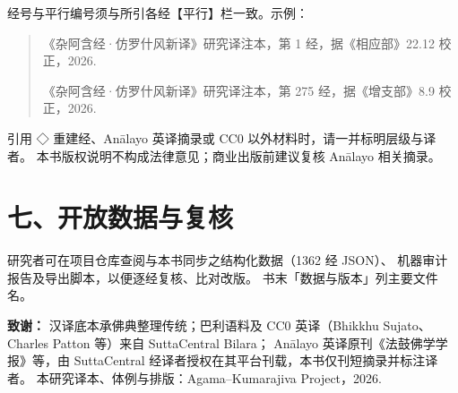 \noindent 经号与平行编号须与所引各经【平行】栏一致。示例：

\begin{quote}\small
《杂阿含经·仿罗什风新译》研究译注本，第 1 经，据《相应部》22.12 校正，2026.

《杂阿含经·仿罗什风新译》研究译注本，第 275 经，据《增支部》8.9 校正，2026.
\end{quote}

\noindent 引用 ◇ 重建经、Anālayo 英译摘录或 CC0 以外材料时，请一并标明层级与译者。
本书版权说明不构成法律意见；商业出版前建议复核 Anālayo 相关摘录。

\section*{七、开放数据与复核}

研究者可在项目仓库查阅与本书同步之结构化数据（1362 经 JSON）、
机器审计报告及导出脚本，以便逐经复核、比对改版。
书末「数据与版本」列主要文件名。

\vspace{0.8em}
\noindent\textbf{致谢：}
汉译底本承佛典整理传统；巴利语料及 CC0 英译（Bhikkhu Sujato、Charles Patton 等）来自 SuttaCentral Bilara；
Anālayo 英译原刊《法鼓佛学学报》等，由 SuttaCentral 经译者授权在其平台刊载，本书仅刊短摘录并标注译者。
本研究译本、体例与排版：Agama–Kumarajiva Project，2026.

\clearpage
